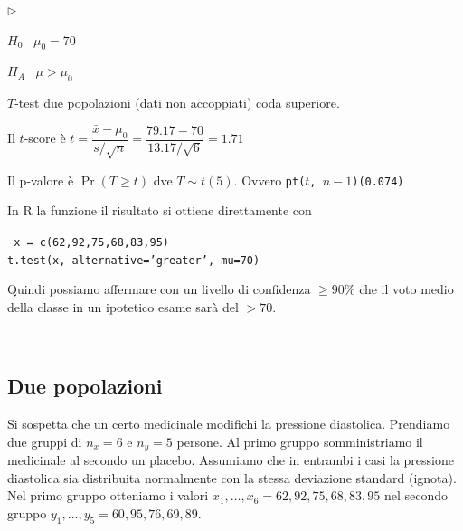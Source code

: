 \documentclass[11pt,openany]{book}
\newcommand{\mylabel}[1]{{\footnotesize\textsf{#1}}\hfill}
\renewenvironment{itemize}
  {\begin{list}{$\triangleright$}{%
   \setlength{\parskip}{0mm}
   \setlength{\topsep}{.2\baselineskip}
   \setlength{\rightmargin}{0mm}
   \setlength{\listparindent}{0mm}
   \setlength{\itemindent}{0mm}
   \setlength{\labelwidth}{3ex}
   \setlength{\itemsep}{.4\baselineskip}
   \setlength{\parsep}{0mm}
   \setlength{\partopsep}{0mm}
   \setlength{\labelsep}{1ex}
   \setlength{\leftmargin}{\labelwidth+\labelsep}
   \let\makelabel\mylabel}}{%
   \end{list}\vspace*{-1.3mm}}
\begin{document}
\begin{itemize}
\item[1.] $H_0$ \ $\mu_0 = 70$

\item[2.] $H_A$ \ $\mu>\mu_0$

\item[3.] $T$-test due popolazioni (dati non accoppiati) coda superiore. 

\item[4.] Il $t$-score è 
$t = \dfrac{\bar x - \mu_0}{s/\sqrt{n}}=\dfrac{79.17-70}{13.17/\sqrt{6}} = 1.71$

\item[5.] Il p-valore è $\Pr(T\ge t)$ dve $T\sim t(5)$. Ovvero {\tt pt($t$, $n-1$)}\hfill{\tt (0.074)}


\hrulefill\hfill\hfill

In R la funzione il risultato si ottiene direttamente con

{\tt 
x = c(62,92,75,68,83,95)\\
t.test(x, alternative='greater', mu=70)}

Quindi possiamo affermare con un livello di confidenza $\ge 90\%$ che il voto medio della classe in un ipotetico esame sarà del $>70$.  
\end{itemize}


\hfill{}\clearpage\
\subsection{Due popolazioni}
Si sospetta che un certo medicinale modifichi la pressione diastolica.  Prendiamo due gruppi di $n_x=6$ e $n_y=5$ persone. Al primo gruppo somministriamo il medicinale al secondo un placebo. Assumiamo che in entrambi i casi la pressione diastolica sia distribuita normalmente con la stessa deviazione standard (ignota). Nel primo gruppo otteniamo i valori $x_1,\dots,x_6=62,92,75,68,83,95$ nel secondo gruppo $y_1,\dots,y_5=60,95,76,69,89$.
\end{document}
